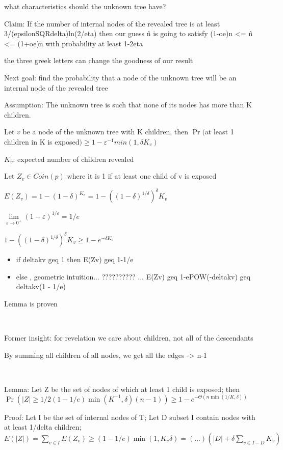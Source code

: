 \documentclass{report}
\begin{document}
	what characteristics should the unknown tree have?
	
	Claim: If the number of internal nodes of the revealed tree is at least 3/(epsilonSQRdelta)ln(2/eta) then our guess \^n is going to satisfy (1-oe)n <= \^n <= (1+oe)n with probability at least 1-2eta
	
	the three greek letters can change the goodness of our result
	
	Next goal: find the probability that a node of the unknown tree will be an internal node of the revealed tree
	
	Assumption: The unknown tree is such that none of its nodes has more than K children.
	
	Let $v$ be a node of the unknown tree with K children, then $\Pr($at least 1 children in K is exposed$) \geq 1-\varepsilon^{-1}min(1, \delta K_v)$
	
	$K_v$: expected number of children revealed
	
	Let $Z_v \in Coin(p)$ where it is 1 if at least one child of v is exposed
	
	$\displaystyle E(Z_v) = 1 - (1 - \delta)^{K_v} = 1 - ((1 - \delta)^{1/\delta})^\delta{K_v}$
	
	$\lim\limits_{\varepsilon \to 0^+}(1-\varepsilon)^{1/\varepsilon} = 1/e$
	
	$1 - ((1 - \delta)^{1/\delta})^\delta{K_v} \geq 1- e^{-\delta K_v}$
	
	
	\begin{itemize}
		\item if deltakv geq 1 then E(Zv) geq 1-1/e
		\item else , geometric intuition... ?????????? ... E(Zv) geq 1-ePOW(-deltakv) geq deltakv(1 - 1/e)
	\end{itemize}
	Lemma is proven
	
	
	\
	
	Former insight: for revelation we care about children, not all of the descendants
	
	By summing all children of all nodes, we get all the edges -> n-1
	
	\
	
	Lemma: Let Z be the set of nodes of which at least 1 child is exposed; then $\Pr(|Z| \geq 1/2(1-1/e)\min(K^{-1}, \delta)(n-1))\geq 1-e^{-\Theta(n\min(1/K, \delta))}$
	
	Proof: Let I be the set of internal nodes of T; Let D subset I contain nodes with at least 1/delta children; $E(|Z|) = \sum_{v \in I}E(Z_v) \geq (1 - 1/e)\min(1, K_v\delta) = (...)(|D| + \delta\sum_{v \in I-D}K_v)$
\end{document}
